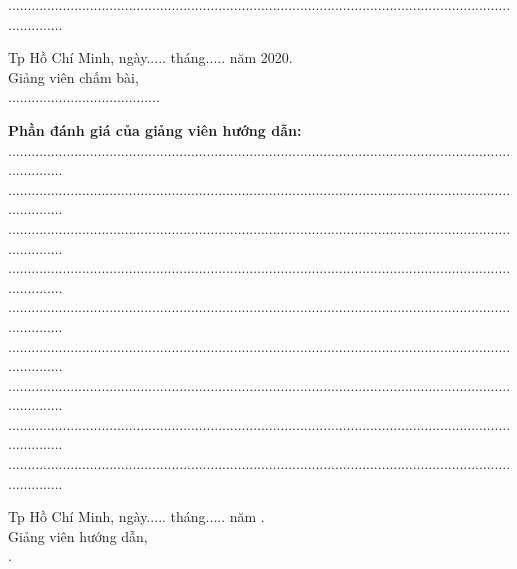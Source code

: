 	...............................................................................................................................................
\begin{center}
	\hspace*{5cm} Tp Hồ Chí Minh, ngày..... tháng..... năm 2020.\\
	\hspace*{5cm} Giảng viên chấm bài,\\
	\vspace*{1.2cm}
	\hspace*{5cm} .......................................
\end{center}
	\vspace*{0.5cm}
	\textbf{Phần đánh giá của giảng viên hướng dẫn:}\\
	...............................................................................................................................................\\
	...............................................................................................................................................\\
	...............................................................................................................................................\\
	...............................................................................................................................................\\
	...............................................................................................................................................\\
	...............................................................................................................................................\\
	...............................................................................................................................................\\
	...............................................................................................................................................\\
	...............................................................................................................................................
\begin{center}
	\hspace*{5cm} Tp Hồ Chí Minh, ngày..... tháng..... năm \nam.\\
	\hspace*{5cm} Giảng viên hướng dẫn,\\
	\vspace*{2cm}
	\hspace*{5cm} \gvhd.
\newpage
\end{center}